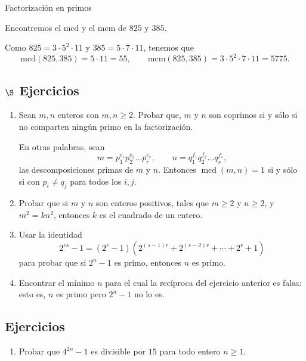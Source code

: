 \begin{section}{Factorización en primos}
\begin{ejemplo*}
Encontremos el mcd y el mcm  de $825$ y $385$.

Como $825 =  3\cdot 5^2\cdot 11$ y $385 = 5\cdot 7\cdot 11$, tenemos que
$$
\text{mcd}(825,385) = 5\cdot 11 = 55, \qquad \text{mcm}(825,385) = 3\cdot 5^2\cdot 7\cdot 11 = 5775.
$$
\end{ejemplo*}


\subsection*{$\S$ Ejercicios}
\begin{enumerate}
    \item Sean $m,n$ enteros con $m,n\ge 2$. Probar que,  $m$ y  $n$ son coprimos si y sólo si no comparten ningún primo en la factorización. 
    
    En otras palabras, sean  
    $$
    m=p_1^{e_1}p_2^{e_2}\ldots p_r^{e_r},\qquad
    n=q_1^{f_1}q_2^{f_2}\ldots q_s^{f_s},
    $$ 
    las descomposiciones primas de $m$ y $n$. Entonces  $\operatorname{mcd}(m,n) =1$ si y sólo si con $p_i \not= q_j$ para todos los $i,j$.  
    
\item Probar que si $m$ y $n$ son enteros positivos, tales que $m\ge 2$ y $n \ge 2$, y
$m^2 = kn^2$, entonces $k$ es el cuadrado de un entero.

\item Usar la identidad
$$
2^{rs} -1 = (2^r-1) (2^{(s-1)r}+2^{(s-2)r}+\cdots +2^r+1)
$$
para probar que si $2^n-1$ es primo, entonces $n$ es primo.

\item Encontrar el mínimo $n$ para el cual la recíproca del ejercicio anterior
es falsa: esto es, $n$ es primo pero $2^n-1$ no lo es.
\end{enumerate}
    
    
\section{Ejercicios}    
\begin{enumerate}
    \item Probar que $4^{2n}-1$ es divisible por $15$ para todo entero $n\ge 1$.


\end{enumerate}
\end{section}
